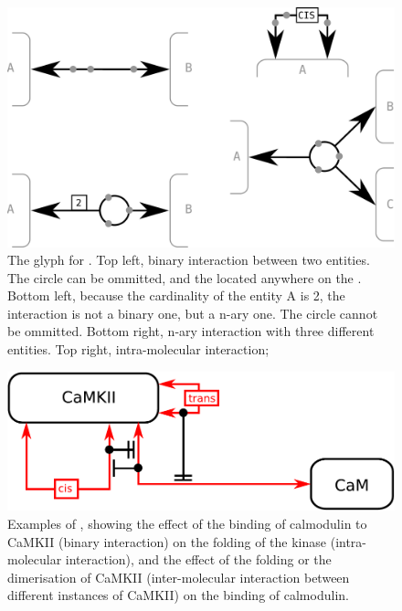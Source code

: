 \begin{figure}[H]
  \centering
  \includegraphics[scale = 0.3]{images/interaction}
  \caption{The \ER glyph for . Top left, binary interaction between two entities. The circle can be ommitted, and the  located anywhere on the . Bottom left, because the cardinality of the entity A is 2, the interaction is not a binary one, but a n-ary one. The circle cannot be ommitted. Bottom right, n-ary interaction with three different entities. Top right, intra-molecular interaction; }
  \label{fig:interaction}
\end{figure}

\begin{figure}[H]
  \centering
  \includegraphics[scale = 0.5]{examples/ex-interaction}
  \caption{Examples of , showing the effect of the binding of calmodulin to CaMKII (binary interaction) on the folding of the kinase (intra-molecular interaction), and the effect of the folding or the dimerisation of CaMKII (inter-molecular interaction between different instances of CaMKII) on the binding of calmodulin.}
  \label{fig:ex-interaction}
\end{figure}


